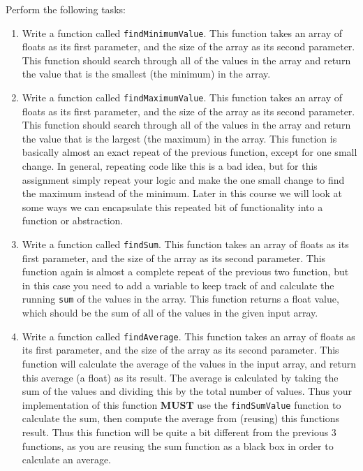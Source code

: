 \documentclass[11pt]{article}
\begin{document}
Perform the following tasks:

\begin{enumerate}
\item Write a function called \verb~findMinimumValue~.  This function takes
an array of floats as its first parameter, and the size of the
array as its second parameter.  This function should search through
all of the values in the array and return the value that is the
smallest (the minimum) in the array.

\item Write a function called \verb~findMaximumValue~.  This function takes an
array of floats as its first parameter, and the size of the array
as its second parameter.  This function should search through all
of the values in the array and return the value that is the largest
(the maximum) in the array.  This function is basically almost an
exact repeat of the previous function, except for one small change.
In general, repeating code like this is a bad idea, but for this
assignment simply repeat your logic and make the one small change
to find the maximum instead of the minimum.  Later in this course
we will look at some ways we can encapsulate this repeated bit of
functionality into a function or abstraction.

\item Write a function called \verb~findSum~.  This function takes an
array of floats as its first parameter, and the size of the array
as its second parameter.  This function again is almost a complete
repeat of the previous two function, but in this case you need to
add a variable to keep track of and calculate the running \verb~sum~ of
the values in the array.  This function returns a float value,
which should be the sum of all of the values in the given input
array.

\item Write a function called \verb~findAverage~.  This function takes
an array of floats as its first parameter, and the size of the array
as its second parameter.  This function will calculate the average
of the values in the input array, and return this average (a float)
as its result.  The average is calculated by taking the sum of the
values and dividing this by the total number of values.  Thus
your implementation of this function \textbf{MUST} use the \verb~findSumValue~
function to calculate the sum, then compute the average from
(reusing) this functions result.  Thus this function will be quite a
bit different from the previous 3 functions, as you are reusing the
sum function as a black box in order to calculate an average.


\end{enumerate}
\end{document}
